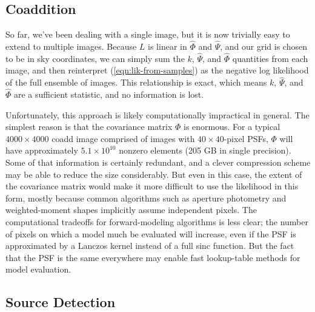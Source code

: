 \documentclass[10pt]{article}
\newcommand{\eqnref}[1]{(\ref{eqn:#1})}
\begin{document}
\subsection{Coaddition}

So far, we've been dealing with a single image, but it is now trivially easy to extend to multiple images.  Because $L$ is linear in $\hat{\Phi}$ and $\hat{\Psi}$, and our grid is chosen to be in sky coordinates, we can simply sum the $k$, $\hat{\Psi}$, and $\hat{\Phi}$ quantities from each image, and then reinterpret \eqnref{lik-from-samples} as the negative log likelihood of the full ensemble of images.  This relationship is exact, which means $k$, $\hat{\Psi}$, and $\hat{\Phi}$ are a sufficient statistic, and no information is lost.

Unfortunately, this approach is likely computationally impractical in general.  The simplest reason is that the covariance matrix $\Phi$ is enormous.  For a typical $4000 \times 4000$ coadd image comprised of images with $40\times 40$-pixel PSFs, $\Phi$ will have approximately $5.1\times 10^10$ nonzero elements (205 GB in single precision).  Some of that information is certainly redundant, and a clever compression scheme may be able to reduce the size considerably.  But even in this case, the extent of the covariance matrix would make it more difficult to use the likelihood in this form, mostly because common algorithms such as aperture photometry and weighted-moment shapes implicitly assume independent pixels.  The computational tradeoffs for forward-modeling algorithms is less clear; the number of pixels on which a model much be evaluated will increase, even if the PSF is approximated by a Lanczos kernel instead of a full sinc function.  But the fact that the PSF is the same everywhere may enable fast lookup-table methods for model evaluation.

\subsection{Source Detection}
\end{document}
